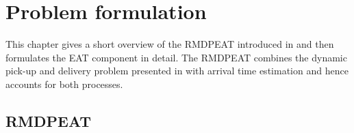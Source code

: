\chapter{Problem formulation}

This chapter gives a short overview of the RMDPEAT introduced in \cite{Hildebrandt2020_EAT} and then formulates the EAT component in detail. The RMDPEAT combines the dynamic pick-up and delivery problem presented in \cite{UlmerRMDP} with arrival time estimation and hence accounts for both processes.  

\section{RMDPEAT} 

